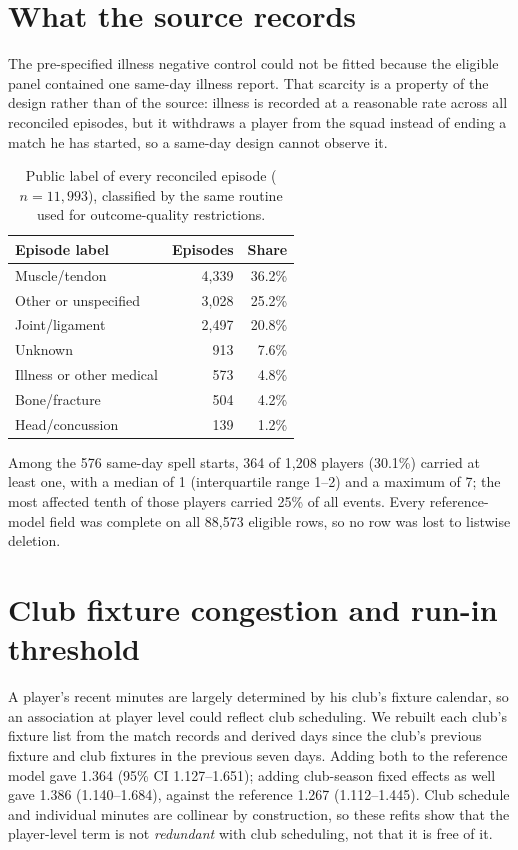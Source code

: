 \documentclass[11pt]{article}
\begin{document}
\section{What the source records}

The pre-specified illness negative control could not be fitted because the eligible panel contained one same-day illness report. That scarcity is a property of the design rather than of the source: illness is recorded at a reasonable rate across all reconciled episodes, but it withdraws a player from the squad instead of ending a match he has started, so a same-day design cannot observe it.

\begin{table}[h]
\centering
\caption{Public label of every reconciled episode ($n=11{,}993$), classified by the same routine used for outcome-quality restrictions.}
\label{tab:supp_episode_types}
\small
\begin{tabular}{lrr}
\toprule
Episode label & Episodes & Share\\
\midrule
Muscle/tendon & 4,339 & 36.2\%\\
Other or unspecified & 3,028 & 25.2\%\\
Joint/ligament & 2,497 & 20.8\%\\
Unknown & 913 & 7.6\%\\
Illness or other medical & 573 & 4.8\%\\
Bone/fracture & 504 & 4.2\%\\
Head/concussion & 139 & 1.2\%\\
\bottomrule
\end{tabular}
\end{table}

Among the 576 same-day spell starts, 364 of 1,208 players (30.1\%) carried at least one, with a median of 1 (interquartile range 1--2) and a maximum of 7; the most affected tenth of those players carried 25\% of all events. Every reference-model field was complete on all 88,573 eligible rows, so no row was lost to listwise deletion.

\section{Club fixture congestion and run-in threshold}

A player's recent minutes are largely determined by his club's fixture calendar, so an association at player level could reflect club scheduling. We rebuilt each club's fixture list from the match records and derived days since the club's previous fixture and club fixtures in the previous seven days. Adding both to the reference model gave 1.364 (95\% CI 1.127--1.651); adding club-season fixed effects as well gave 1.386 (1.140--1.684), against the reference 1.267 (1.112--1.445). Club schedule and individual minutes are collinear by construction, so these refits show that the player-level term is not \emph{redundant} with club scheduling, not that it is free of it.
\end{document}
